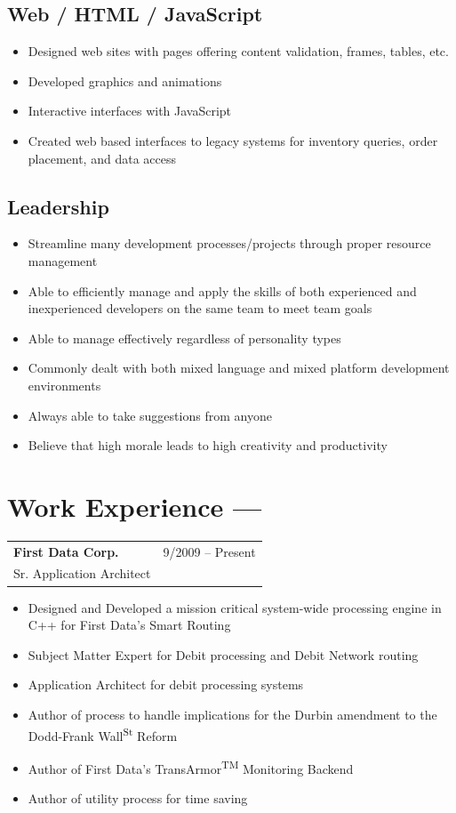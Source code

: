 \documentclass[10pt]{report}
\begin{document}
\subsection*{Web / HTML / JavaScript}
\begin{itemize}
\item Designed web sites with pages offering content validation, frames, tables, etc.
\item Developed graphics and animations
\item Interactive interfaces with JavaScript
\item Created web based interfaces to legacy systems for inventory queries, order placement, and data access
\end{itemize}

\subsection*{Leadership}
\begin{itemize}
\item Streamline many development processes/projects through proper resource management
\item Able to efficiently manage and apply the skills of both experienced and inexperienced developers on the same team to meet team goals
\item Able to manage effectively regardless of personality types
\item Commonly dealt with both mixed language and mixed platform development environments
\item Always able to take suggestions from anyone
\item Believe that high morale leads to high creativity and productivity
\end{itemize}

\pagebreak

\section*{Work Experience ---}

\noindent
\begin{tabular}{ L{.5\textwidth}  R{.4\textwidth} }
\textbf{\large First Data Corp.} & 9/2009 -- Present \\
Sr. Application Architect &
\end{tabular}


\begin{itemize}
\item Designed and Developed a mission critical system-wide processing engine in C++ for First Data's Smart Routing
\item Subject Matter Expert for Debit processing and Debit Network routing 
\item Application Architect for debit processing systems
\item Author of process to handle implications for the Durbin amendment to the Dodd-Frank Wall\textsuperscript{\tiny St} Reform
\item Author of First Data's TransArmor\textsuperscript{\tiny TM} Monitoring Backend
\item Author of utility process for time saving
\end{itemize}
\bigskip
\end{document}
